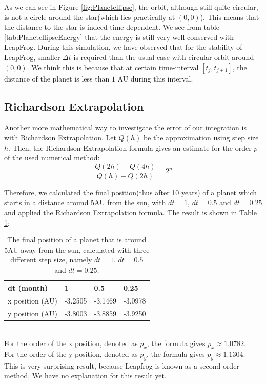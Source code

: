 As we can see in Figure \ref{fig:Planetellipse}, the orbit, although still quite circular, is not a circle around the star(which lies practically at $(0,0)$). This means that the distance to the star is indeed time-dependent. We see from table \ref{tab:PlanetellipseEnergy} that the energy is still very well conserved with LeapFrog. During this simulation, we have observed that for the stability of LeapFrog, smaller $\Delta t$ is required than the usual case with circular orbit around $(0,0)$. We think this is because that at certain time-interval $[t_j,t_{j+1}]$, the distance of the planet is less than $1$ AU during this interval. 
\subsection{Richardson Extrapolation}
Another more mathematical way to investigate the error of our integration is with Richardson Extrapolation. 
Let $Q(h)$ be the approximation using step size $h$. 
Then, the Richardson Extrapolation formula \cite{Richardson} gives an estimate for the order $p$ of the used numerical method:
\[\frac{Q(2h)-Q(4h)}{Q(h)-Q(2h)}=2^p\]

Therefore, we calculated the final position(thus after 10 years) of a planet which starts in a distance around 5AU from the sun, with $dt=1$, $dt=0.5$ and $dt=0.25$ and applied the Richardson Extrapolation formula. 
The result is shown in Table \ref{tab:Richardson5AU}:

\begin{table}[htb]
\centering
\caption{The final position of a planet that is around 5AU away from the sun, calculated with three different step size, namely $dt=1$, $dt=0.5$ and $dt=0.25$.}
\begin{tabular}{|l|l|l|l|}
\hline
dt (month)&1&0.5&0.25\\ \hline
x position (AU)&-3.2505&   -3.1469&   -3.0978\\ \hline
y position (AU)&   -3.8003&   -3.8859&   -3.9250\\ \hline
\end{tabular}
\label{tab:Richardson5AU}
\end{table}
\leavevmode
\\
For the order of the x position, denoted as $p_x$, the formula gives $p_x\approx 1.0782$.\\
For the order of the y position, denoted as $p_y$, the formula gives $p_y\approx 1.1304$.\\ 

This is very surprising result, because Leapfrog is known as a second order method. We have no explanation for this result yet.
